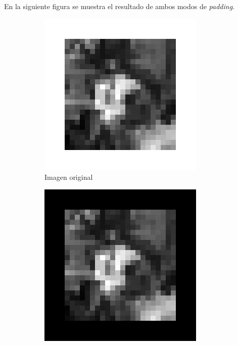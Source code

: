 En la siguiente figura se muestra el resultado de ambos modos de \emph{padding}.
%
\begin{figure}[h!]
    \caption{Comparación de los modos de \emph{padding}: \emph{zero} y \emph{mirror}.}
    \label{fig:padding_comparison}
    \centering
    \begin{subfigure}[t]{0.3\textwidth}
        \includegraphics[width=\textwidth]{3_Reconocimiento/Figs/for_padding}
        \caption{Imagen original}
    \end{subfigure}
    \hfill
    \begin{subfigure}[t]{0.3\textwidth}
        \includegraphics[width=\textwidth]{3_Reconocimiento/Figs/zero_padding}

\end{subfigure}
\end{figure}
